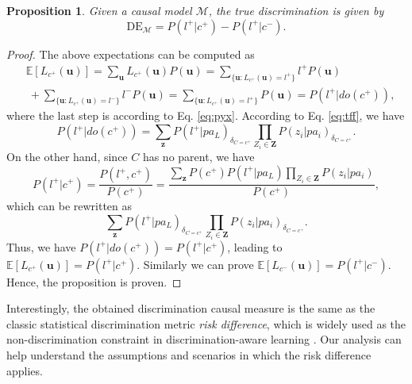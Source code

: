 \documentclass{article}
\newtheorem{proposition}{Proposition}
\begin{document}
\begin{proposition}\label{thm:dem}
Given a causal model $\mathcal{M}$, the true discrimination is given by
\begin{equation*}
\mathrm{DE}_{\mathcal{M}} = P(l^{+}|c^{+}) - P(l^{+}|c^{-}).
\end{equation*}
\end{proposition}

\begin{proof}
The above expectations can be computed as
\begin{equation}\label{eq:lc}
\begin{split}
& \mathbb{E}[L_{c^{+}}(\mathbf{u})] = \sum_{\mathbf{u}}L_{c^{+}}(\mathbf{u})P(\mathbf{u}) = \sum_{\{\mathbf{u}:L_{c^{+}}(\mathbf{u})=l^{+}\}} l^{+} P(\mathbf{u}) \\
& ~ + \sum_{\{\mathbf{u}:L_{c^{+}}(\mathbf{u})=l^{-}\}} l^{-} P(\mathbf{u}) = \sum_{\{\mathbf{u}:L_{c^{+}}(\mathbf{u})=l^{+}\}} P(\mathbf{u}) = P(l^{+}|do(c^{+})),
\end{split}
\end{equation}
where the last step is according to Eq. \eqref{eq:pyx}. According to Eq. \eqref{eq:tff}, we have
\begin{equation*}
P(l^{+}|do(c^{+})) = \sum_{\mathbf{z}} P(l^{+}|pa_{L})_{\delta_{C=c^{+}}} \prod_{Z_{i}\in \mathbf{Z}}P(z_{i}|pa_{i})_{\delta_{C=c^{+}}}.
\end{equation*}
On the other hand, since $C$ has no parent, we have
\begin{equation*}
P(l^{+}|c^{+}) = \frac{P(l^{+},c^{+})}{P(c^{+})} = \frac{\sum_{\mathbf{z}}P(c^{+})P(l^{+}|pa_{L})\prod_{Z_{i}\in \mathbf{Z}}P(z_{i}|pa_{i})}{P(c^{+})},
\end{equation*}
which can be rewritten as
\begin{equation*}
\sum_{\mathbf{z}} P(l^{+}|pa_{L})_{\delta_{C=c^{+}}} \prod_{Z_{i}\in \mathbf{Z}}P(z_{i}|pa_{i})_{\delta_{C=c^{+}}}.
\end{equation*}
Thus, we have $P(l^{+}|do(c^{+})) = P(l^{+}|c^{+})$, leading to $\mathbb{E}[L_{c^{+}}(\mathbf{u})] = P(l^{+}|c^{+})$. Similarly we can prove $\mathbb{E}[L_{c^{-}}(\mathbf{u})] = P(l^{+}|c^{-})$. Hence, the proposition is proven.
\end{proof}

Interestingly, the obtained discrimination causal measure is the same as the classic statistical discrimination metric \emph{risk difference}, which is widely used as the non-discrimination constraint in discrimination-aware learning \cite{romei2014multidisciplinary}. Our analysis can help understand the assumptions and scenarios in which the risk difference applies.
\end{document}
